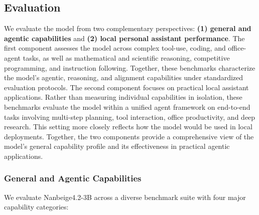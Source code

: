 \subsection{Evaluation}

We evaluate the model from two complementary perspectives: \textbf{(1) general and agentic capabilities} and \textbf{(2) local personal assistant performance}.
The first component assesses the model across complex tool-use, coding, and office-agent tasks, as well as mathematical and scientific reasoning, competitive programming, and instruction following. Together, these benchmarks characterize the model's agentic, reasoning, and alignment capabilities under standardized evaluation protocols.
The second component focuses on practical local assistant applications. Rather than measuring individual capabilities in isolation, these benchmarks evaluate the model within a unified agent framework on end-to-end tasks involving multi-step planning, tool interaction, office productivity, and deep research. This setting more closely reflects how the model would be used in local deployments.
Together, the two components provide a comprehensive view of the model’s general capability profile and its effectiveness in practical agentic applications.

\subsubsection{General and Agentic Capabilities}

We evaluate Nanbeige4.2-3B across a diverse benchmark suite with four major capability categories:

